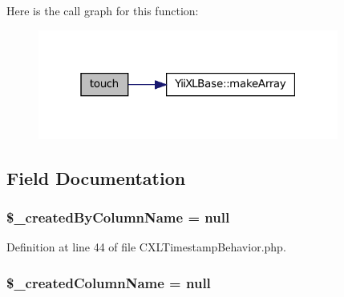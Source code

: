 Here is the call graph for this function:\nopagebreak
\begin{figure}[H]
\begin{center}
\leavevmode
\includegraphics[width=280pt]{classCXLTimeStampBehavior_aa5ac765fd764508a2e486e01a725b4a1_cgraph}
\end{center}
\end{figure}




\subsection{Field Documentation}
\hypertarget{classCXLTimeStampBehavior_a1cc2ac641f86886d76944efce3a63bd9}{
\subsubsection[{\$\_\-createdByColumnName}]{\setlength{\rightskip}{0pt plus 5cm}\$\_\-createdByColumnName = null}}
\label{classCXLTimeStampBehavior_a1cc2ac641f86886d76944efce3a63bd9}


Definition at line 44 of file CXLTimestampBehavior.php.

\hypertarget{classCXLTimeStampBehavior_a99123cf87dc35241fa4de90963dfcb55}{
\subsubsection[{\$\_\-createdColumnName}]{\setlength{\rightskip}{0pt plus 5cm}\$\_\-createdColumnName = null}}
\label{classCXLTimeStampBehavior_a99123cf87dc35241fa4de90963dfcb55}



